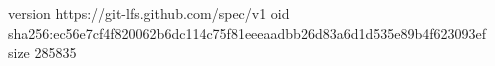 version https://git-lfs.github.com/spec/v1
oid sha256:ec56e7cf4f820062b6dc114c75f81eeeaadbb26d83a6d1d535e89b4f623093ef
size 285835
